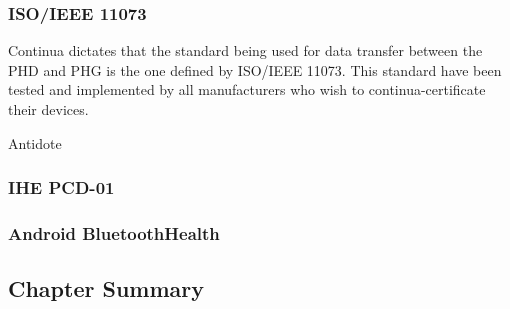 \subsubsection{ISO/IEEE 11073}
\label{subsub:ieee11073}
	Continua dictates that the standard being used for data transfer between the PHD and PHG is the one defined by ISO/IEEE 11073. This standard have been tested and implemented by all manufacturers who wish to continua-certificate their devices. 
	
	Antidote


\subsubsection{IHE PCD-01}
\label{subsub:ihepcd01}

\subsubsection{Android BluetoothHealth}
\label{subsub:bthealth}

\subsection{Chapter Summary}
\label{sub:backSum}
